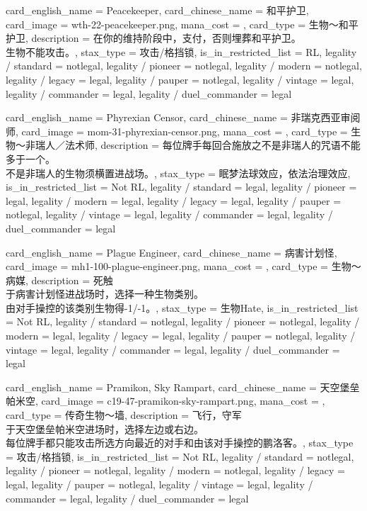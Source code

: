 \documentclass[lang = cn, color = black, 10pt]{AllThatStax}
\begin{document}
\card
{
	card_english_name = {Peacekeeper},
	card_chinese_name = {和平护卫},
	card_image = wth-22-peacekeeper.png,
	mana_cost = ,
	card_type = 生物～和平护卫,
	description = {在你的维持阶段中，支付，否则埋葬和平护卫。\\
生物不能攻击。},
	stax_type = 攻击/格挡锁,
	is_in_restricted_list = RL,
	legality / standard = notlegal,
	legality / pioneer = notlegal,
	legality / modern = notlegal,
	legality / legacy = legal,
	legality / pauper = notlegal,
	legality / vintage = legal,
	legality / commander = legal,
	legality / duel_commander = legal
}

\card
{
	card_english_name = {Phyrexian Censor},
	card_chinese_name = {非瑞克西亚审阅师},
	card_image = mom-31-phyrexian-censor.png,
	mana_cost = ,
	card_type = 生物～非瑞人／法术师,
	description = {每位牌手每回合施放之不是非瑞人的咒语不能多于一个。\\
不是非瑞人的生物须横置进战场。},
	stax_type = 眠梦法球效应，依法治理效应,
	is_in_restricted_list = Not RL,
	legality / standard = legal,
	legality / pioneer = legal,
	legality / modern = legal,
	legality / legacy = legal,
	legality / pauper = notlegal,
	legality / vintage = legal,
	legality / commander = legal,
	legality / duel_commander = legal
}

\card
{
	card_english_name = {Plague Engineer},
	card_chinese_name = {病害计划怪},
	card_image = mh1-100-plague-engineer.png,
	mana_cost = ,
	card_type = 生物～病媒,
	description = {死触\\
于病害计划怪进战场时，选择一种生物类别。\\
由对手操控的该类别生物得-1/-1。},
	stax_type = 生物Hate,
	is_in_restricted_list = Not RL,
	legality / standard = notlegal,
	legality / pioneer = notlegal,
	legality / modern = legal,
	legality / legacy = legal,
	legality / pauper = notlegal,
	legality / vintage = legal,
	legality / commander = legal,
	legality / duel_commander = legal
}

\card
{
	card_english_name = {Pramikon, Sky Rampart},
	card_chinese_name = {天空堡垒帕米空},
	card_image = c19-47-pramikon-sky-rampart.png,
	mana_cost = ,
	card_type = 传奇生物～墙,
	description = {飞行，守军\\
于天空堡垒帕米空进场时，选择左边或右边。\\
每位牌手都只能攻击所选方向最近的对手和由该对手操控的鹏洛客。},
	stax_type = 攻击/格挡锁,
	is_in_restricted_list = Not RL,
	legality / standard = notlegal,
	legality / pioneer = notlegal,
	legality / modern = notlegal,
	legality / legacy = legal,
	legality / pauper = notlegal,
	legality / vintage = legal,
	legality / commander = legal,
	legality / duel_commander = legal
}
\end{document}
